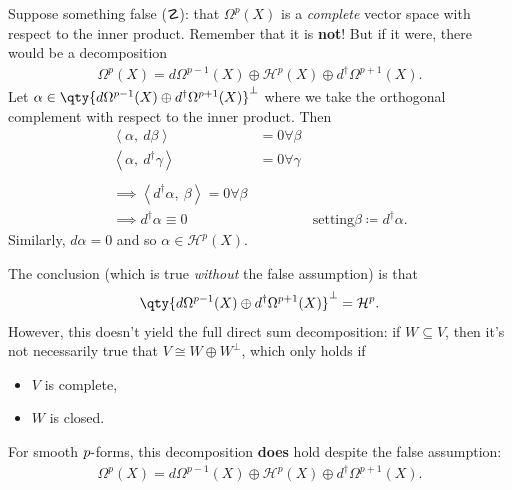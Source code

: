 \begin{observation}

Suppose something false (\(\danger\)): that \(\Omega^p(X)\) is a
\emph{complete} vector space with respect to the inner product. Remember
that it is \textbf{not}! But if it were, there would be a decomposition
\begin{align*}
\Omega^p(X) = d \Omega^{p-1}(X) \oplus \mathcal{H}^p(X) \oplus d^\dagger \Omega^{p+1}(X) 
.\end{align*}
Let
\(\alpha\in \qty{ d \Omega^{p-1}(X) \oplus d^\dagger \Omega^{p+1}(X)}^\perp\)
where we take the orthogonal complement with respect to the inner
product. Then
\begin{align*}
{\left\langle { \alpha },~{ d \beta } \right\rangle} &= 0 \forall \beta \\
{\left\langle { \alpha },~{ d^\dagger \gamma } \right\rangle} &= 0 \forall \gamma\\ \\
\implies {\left\langle { d^\dagger \alpha},~{ \beta} \right\rangle} = 0 \forall \beta \\
\implies d^\dagger \alpha \equiv 0 && \text{setting} \beta\coloneqq d^\dagger \alpha
.\end{align*}
Similarly, \(d \alpha = 0\) and so \(\alpha\in \mathcal{H}^p(X)\).

The conclusion (which is true \emph{without} the false assumption) is
that
\begin{align*}
\qty{ d \Omega^{p-1}(X) \oplus d^\dagger \Omega^{p+1}(X)}^\perp = \mathcal{H}^p 
.\end{align*}
However, this doesn't yield the full direct sum decomposition: if
\(W \subseteq V\), then it's not necessarily true that
\(V \cong W \oplus W^\perp\), which only holds if

\begin{itemize}
\item
  \(V\) is complete,
\item
  \(W\) is closed.
\end{itemize}

\end{observation}

\begin{fact}

For smooth \(p{\hbox{-}}\)forms, this decomposition \textbf{does} hold
despite the false assumption:
\begin{align*}
\Omega^p(X) = d \Omega^{p-1}(X) \oplus \mathcal{H}^p(X) \oplus d^\dagger \Omega^{p+1}(X) 
.\end{align*}

\end{fact}

